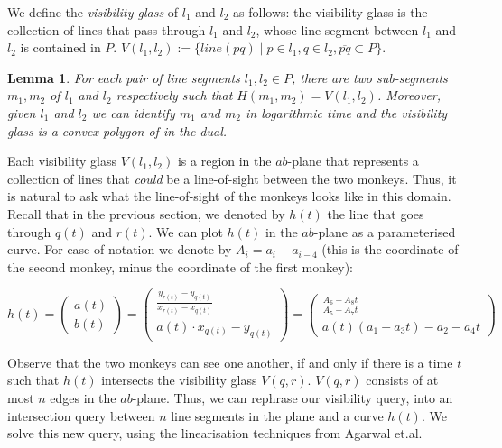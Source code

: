 \documentclass{article}
\newtheorem{lemma}{Lemma}
\newcommand{\etal}{et.al\xspace}
\begin{document}
We define the \emph{visibility glass} of $l_1$ and $l_2$ as follows: the visibility glass is the collection of lines that pass through $l_1$ and $l_2$, whose line segment between $l_1$ and $l_2$ is contained in $P$. $V(l_1, l_2) := \{ line(pq) \mid p \in l_1, q \in l_2,  \overline{pq} \subset P \}$. \\

\begin{lemma}
  For each pair of line segments $l_1, l_2 \in P$, there are two sub-segments $m_1, m_2$ of $l_1$ and $l_2$ respectively such that $H(m_1, m_2) = V(l_1, l_2)$. Moreover, given $l_1$ and $l_2$ we can identify $m_1$ and $m_2$ in logarithmic time and the visibility glass is a convex polygon of in the dual.
\end{lemma}

Each visibility glass $V(l_1, l_2)$ is a region in the $ab$-plane that represents a collection of lines that \emph{could} be a line-of-sight between the two monkeys. Thus, it is natural to ask what the line-of-sight of the monkeys looks like in this domain. Recall that in the previous section, we denoted by $h(t)$ the line that goes through $q(t)$ and $r(t)$. We can plot $h(t)$ in the $ab$-plane as a parameterised curve. For ease of notation we denote by $A_i = a_i - a_{i-4}$ (this is the coordinate of the second monkey, minus the coordinate of the first monkey):


  \begin{equation*}
   h(t) = \left( \begin{array}{c}
         a(t)  \\
         b(t) 
    \end{array}  \right) = 
    \left( \begin{array}{c}
         \frac{y_{r(t)} - y_{q(t)}}{x_{r(t)} - x_{q(t)}}  \\
         a(t)\cdot x_{q(t)} - y_{q(t)}
    \end{array}  \right) =
    \left( \begin{array}{c}
         \frac{ A_6 + A_8 t}
      { A_5  + A_7 t }  \\
         a(t)(a_1 - a_3 t) - a_2 - a_4 t 
    \end{array}  \right)
  \end{equation*}

Observe that the two monkeys can see one another, if and only if there is a time $t$ such that $h(t)$ intersects the visibility glass $V(q, r)$. $V(q, r)$ consists of at most $n$ edges in the $ab$-plane. Thus, we can rephrase our visibility query, into an intersection query between $n$ line segments in the plane and a curve $h(t)$.
We solve this new query, using the linearisation techniques from Agarwal \etal \cite{agarwal2013range}.
\end{document}
